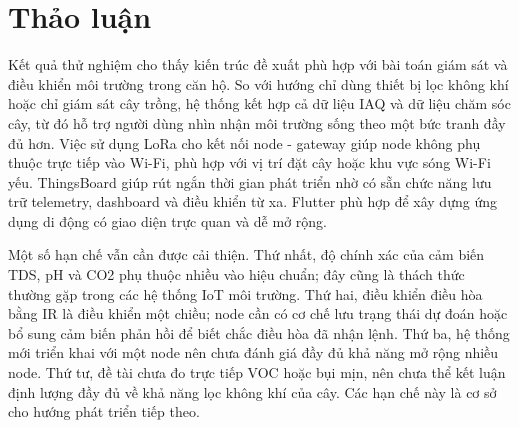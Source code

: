 \section{Thảo luận}
Kết quả thử nghiệm cho thấy kiến trúc đề xuất phù hợp với bài toán giám sát và điều khiển môi trường trong căn hộ. So với hướng chỉ dùng thiết bị lọc không khí hoặc chỉ giám sát cây trồng, hệ thống kết hợp cả dữ liệu IAQ và dữ liệu chăm sóc cây, từ đó hỗ trợ người dùng nhìn nhận môi trường sống theo một bức tranh đầy đủ hơn. Việc sử dụng LoRa cho kết nối node - gateway giúp node không phụ thuộc trực tiếp vào Wi-Fi, phù hợp với vị trí đặt cây hoặc khu vực sóng Wi-Fi yếu. ThingsBoard giúp rút ngắn thời gian phát triển nhờ có sẵn chức năng lưu trữ telemetry, dashboard và điều khiển từ xa. Flutter phù hợp để xây dựng ứng dụng di động có giao diện trực quan và dễ mở rộng.

Một số hạn chế vẫn cần được cải thiện. Thứ nhất, độ chính xác của cảm biến TDS, pH và CO2 phụ thuộc nhiều vào hiệu chuẩn; đây cũng là thách thức thường gặp trong các hệ thống IoT môi trường. Thứ hai, điều khiển điều hòa bằng IR là điều khiển một chiều; node cần có cơ chế lưu trạng thái dự đoán hoặc bổ sung cảm biến phản hồi để biết chắc điều hòa đã nhận lệnh. Thứ ba, hệ thống mới triển khai với một node nên chưa đánh giá đầy đủ khả năng mở rộng nhiều node. Thứ tư, đề tài chưa đo trực tiếp VOC hoặc bụi mịn, nên chưa thể kết luận định lượng đầy đủ về khả năng lọc không khí của cây. Các hạn chế này là cơ sở cho hướng phát triển tiếp theo.

